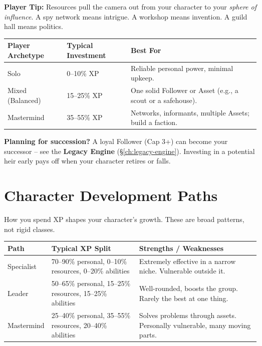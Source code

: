 \noindent\textbf{Player Tip:} Resources pull the camera out from your character
to your \emph{sphere of influence}. A spy network means intrigue. A workshop
means invention. A guild hall means politics.

\begin{tcolorbox}[colback=green!5!white, colframe=green!75!black, title=When to Invest in Assets and Followers,breakable]
\centering
\begin{tabularx}{0.95\textwidth}{l l X}
\toprule
\textbf{Player Archetype} & \textbf{Typical Investment} & \textbf{Best For} \\
\midrule
Solo & 0--10\% XP & Reliable personal power, minimal upkeep. \\
Mixed (Balanced) & 15--25\% XP & One solid Follower or Asset (e.g., a scout or a safehouse). \\
Mastermind & 35--55\% XP & Networks, informants, multiple Assets; build a faction. \\
\bottomrule
\end{tabularx}
\vspace{0.2cm}

\textbf{Planning for succession?} A loyal Follower (Cap 3+) can become your successor -- see the \textbf{Legacy Engine} (\S\ref{ch:legacy-engine}). Investing in a potential heir early pays off when your character retires or falls.
\end{tcolorbox}

\newpage
\section{Character Development Paths}
\label{sec:development-paths}

How you spend XP shapes your character's growth. These are broad patterns, not
rigid classes.

\begin{center}
\begin{tabular}{p{3cm}p{2.8cm}p{6cm}}
\toprule
\textbf{Path} & \textbf{Typical XP Split} & \textbf{Strengths / Weaknesses} \\
\midrule
Specialist & 70--90\% personal, 0--10\% resources, 0--20\% abilities & Extremely effective in a narrow niche. Vulnerable outside it. \\
Leader     & 50--65\% personal, 15--25\% resources, 15--25\% abilities & Well-rounded, boosts the group. Rarely the best at one thing. \\
Mastermind & 25--40\% personal, 35--55\% resources, 20--40\% abilities & Solves problems through assets. Personally vulnerable, many moving parts. \\
\bottomrule
\end{tabular}
\end{center}


